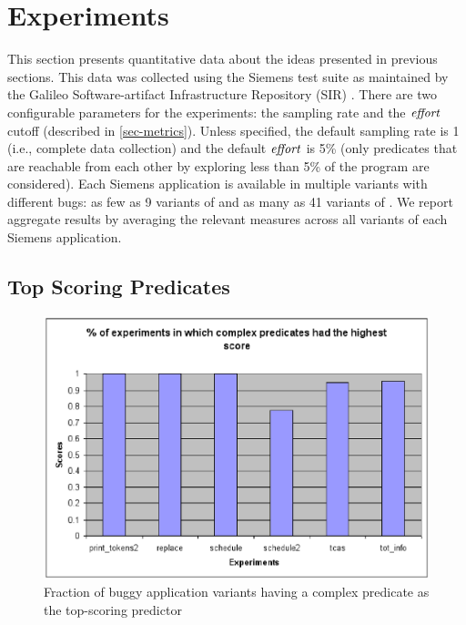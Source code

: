 
\section{Experiments}
\label{sec-experiments}

This section presents quantitative data about the ideas presented in previous sections.  This data was collected using the Siemens test suite \cite{257766} as maintained by the Galileo Software-artifact Infrastructure Repository (SIR) \cite{Do05,SAI}.  There are two configurable parameters for the experiments: the sampling rate and the $\mathit{effort}$ cutoff (described in \autoref{sec-metrics}).  Unless specified, the default sampling rate is 1 (i.e., complete data collection) and the default $\mathit{effort}$ is 5\% (only predicates that are reachable from each other by exploring less than 5\% of the program are considered).  Each Siemens application is available in multiple variants with different bugs: as few as 9 variants of  and as many as 41 variants of .  We report aggregate results by averaging the relevant measures across all variants of each Siemens application.

\subsection{Top Scoring Predicates}

\label{sec-quant}
\begin{figure}[tb]
  \centering
  \includegraphics{charts/top-pred}
  \caption{Fraction of buggy application variants having a complex predicate as the top-scoring predictor}
  \label{fig-top-pred}
\end{figure}

